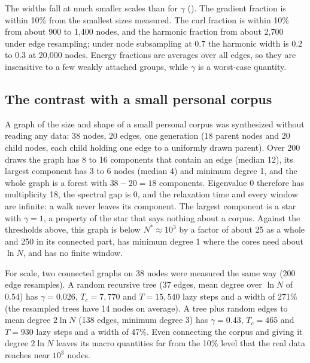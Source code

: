 \documentclass[11pt]{article}
\begin{document}
The widths fall at much smaller scales than for $\gamma$ (). The gradient fraction is
within 10\% from the smallest sizes measured. The curl fraction is within 10\% from about 900 to
1,400 nodes, and the harmonic fraction from about 2,700 under edge resampling; under node
subsampling at 0.7 the harmonic width is 0.2 to 0.3 at 20,000 nodes. Energy fractions are averages
over all edges, so they are insensitive to a few weakly attached groups, while $\gamma$ is a
worst-case quantity.

\subsection{The contrast with a small personal corpus}
A graph of the size and shape of a small personal corpus was synthesized without reading any data:
38 nodes, 20 edges, one generation (18 parent nodes and 20 child nodes, each child holding one edge
to a uniformly drawn parent). Over 200 draws the graph has 8 to 16 components that contain an
edge (median 12), its largest component has 3 to 6 nodes (median 4) and minimum degree 1, and the whole
graph is a forest with $38 - 20 = 18$ components. Eigenvalue 0 therefore has multiplicity 18, the spectral
gap is 0, and the relaxation time and every window are infinite: a walk never leaves its component.
The largest component is a star with $\gamma = 1$, a property of the star that says nothing
about a corpus. Against the thresholds above, this graph is below $N^{*} \approx 10^3$ by a factor of
about 25 as a whole and 250 in its connected part, has minimum degree 1 where the
cores need about $\ln N$, and has no finite window.

For scale, two connected graphs on 38 nodes were measured the same way (200 edge resamples). A random
recursive tree (37 edges, mean degree over $\ln N$ of 0.54) has $\gamma = 0.026$, $T_c = 7{,}770$ and
$T = 15{,}540$ lazy steps and a width of 271\% (the resampled trees have 14 nodes on average). A tree plus random edges
to mean degree $2\ln N$ (138 edges, minimum degree 3) has $\gamma = 0.43$, $T_c = 465$ and $T = 930$ lazy steps and a
width of 47\%. Even connecting the corpus and giving it degree $2 \ln N$ leaves its macro quantities
far from the 10\% level that the real data reaches near $10^3$ nodes.
\end{document}
